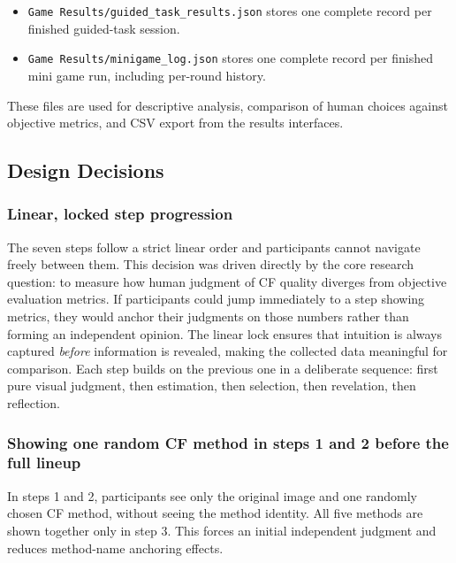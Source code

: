 \documentclass[
  letterpaper,
  DIV=11,
  numbers=noendperiod]{scrartcl}
\providecommand{\tightlist}{%
  \setlength{\itemsep}{0pt}\setlength{\parskip}{0pt}}\usepackage{longtable,booktabs,array}
\begin{document}
\begin{itemize}
\tightlist
\item
  \texttt{Game\ Results/guided\_task\_results.json} stores one complete
  record per finished guided-task session.
\item
  \texttt{Game\ Results/minigame\_log.json} stores one complete record
  per finished mini game run, including per-round history.
\end{itemize}

These files are used for descriptive analysis, comparison of human
choices against objective metrics, and CSV export from the results
interfaces.

\subsection{Design Decisions}\label{design-decisions}

\subsubsection{Linear, locked step
progression}\label{linear-locked-step-progression}

The seven steps follow a strict linear order and participants cannot
navigate freely between them. This decision was driven directly by the
core research question: to measure how human judgment of CF quality
diverges from objective evaluation metrics. If participants could jump
immediately to a step showing metrics, they would anchor their judgments
on those numbers rather than forming an independent opinion. The linear
lock ensures that intuition is always captured \emph{before} information
is revealed, making the collected data meaningful for comparison. Each
step builds on the previous one in a deliberate sequence: first pure
visual judgment, then estimation, then selection, then revelation, then
reflection.

\subsubsection{Showing one random CF method in steps 1 and 2 before the
full
lineup}\label{showing-one-random-cf-method-in-steps-1-and-2-before-the-full-lineup}

In steps 1 and 2, participants see only the original image and one
randomly chosen CF method, without seeing the method identity. All five
methods are shown together only in step 3. This forces an initial
independent judgment and reduces method-name anchoring effects.
\end{document}
